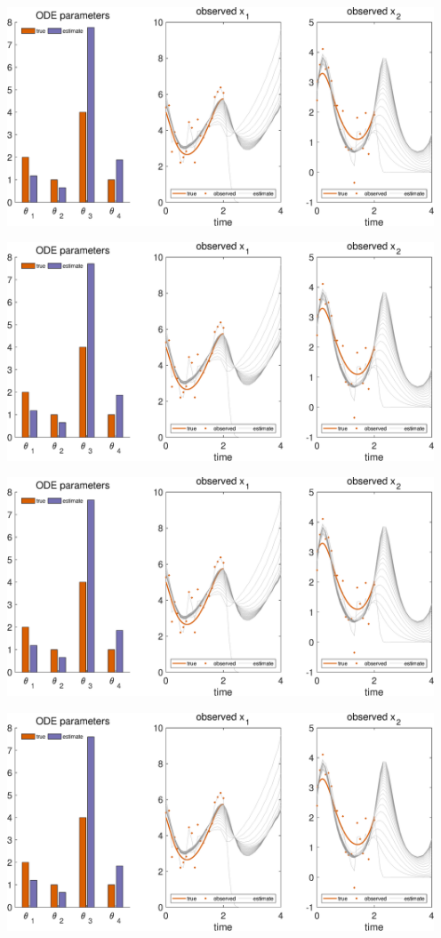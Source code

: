 {\includegraphics [width=5in]{VGM_for_Lotka_Volterra_26.eps}

\includegraphics [width=5in]{VGM_for_Lotka_Volterra_27.eps}

\includegraphics [width=5in]{VGM_for_Lotka_Volterra_28.eps}

\includegraphics [width=5in]{VGM_for_Lotka_Volterra_29.eps}

}
